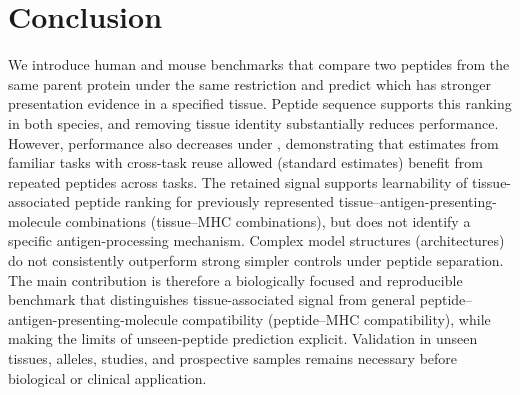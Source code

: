 \section{Conclusion}

We introduce human and mouse benchmarks that compare two peptides from the same parent protein under the same \plainMHC{} restriction and predict which has stronger presentation evidence in a specified tissue. Peptide sequence supports this ranking in both species, and removing tissue identity substantially reduces performance. However, performance also decreases under \plainPeptideOOF{}, demonstrating that estimates from familiar tasks with cross-task reuse allowed (standard estimates) benefit from repeated peptides across tasks. The retained signal supports learnability of tissue-associated peptide ranking for previously represented tissue--antigen-presenting-molecule combinations (tissue--MHC combinations), but does not identify a specific antigen-processing mechanism. Complex model structures (architectures) do not consistently outperform strong simpler controls under peptide separation. The main contribution is therefore a biologically focused and reproducible benchmark that distinguishes tissue-associated signal from general peptide--antigen-presenting-molecule compatibility (peptide--MHC compatibility), while making the limits of unseen-peptide prediction explicit. Validation in unseen tissues, alleles, studies, and prospective samples remains necessary before biological or clinical application.
